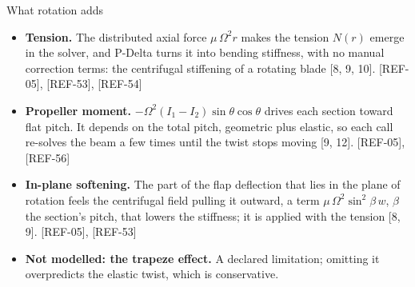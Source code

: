 \begin{frame}{What rotation adds}
\begin{itemize}\small
  \item \textbf{Tension.} The distributed axial force \(\mu\,\Omega^2 r\)
        makes the tension \(N(r)\) emerge in the solver, and P-Delta turns it
        into bending stiffness, with no manual correction terms: the
        centrifugal stiffening of a rotating blade [8, 9, 10]. [REF-05], [REF-53], [REF-54]
  \item \textbf{Propeller moment.} \(-\Omega^2 (I_1 - I_2)\sin\theta\cos\theta\)
        drives each section toward flat pitch. It depends on the total pitch,
        geometric plus elastic, so each call re-solves the beam a few times
        until the twist stops moving [9, 12]. [REF-05], [REF-56]
  \item \textbf{In-plane softening.} The part of the flap deflection that
        lies in the plane of rotation feels the centrifugal field pulling it
        outward, a term \(\mu\,\Omega^2 \sin^2\beta\,w\), \(\beta\) the
        section's pitch, that lowers the stiffness; it is applied with the
        tension [8, 9]. [REF-05], [REF-53]
  \item \textbf{Not modelled: the trapeze effect.} A declared limitation;
        omitting it overpredicts the elastic twist, which is conservative.
\end{itemize}
\end{frame}


